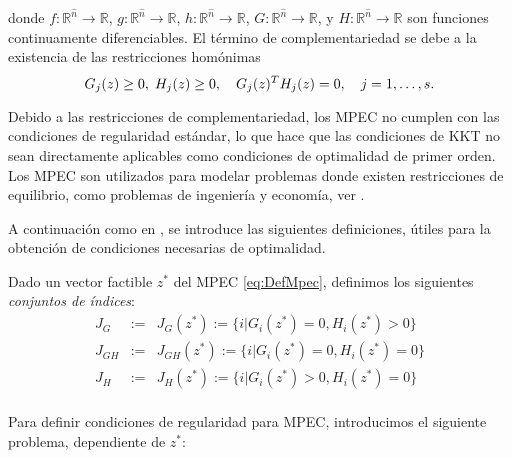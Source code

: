 donde $f: \mathbb{R}^{\hat{n}} \to \mathbb{R}$, $g: \mathbb{R}^{\hat{n}} \to \mathbb{R}$, $h: \mathbb{R}^{\hat{n}} \to \mathbb{R}$, $G: \mathbb{R}^{\hat{n}} \to \mathbb{R}$, y $H: \mathbb{R}^{\hat{n}} \to \mathbb{R}$ son funciones continuamente diferenciables. 
El término de complementariedad se debe a la existencia de las restricciones homónimas 
\begin{equation}
    G_j(z) \geq 0, \; H_j(z) \geq 0, \quad G_j(z)^T H_j(z) = 0,\quad  j=1,\ldots,s. \\ \label{eq:RestriccionesComplementariedadAbstracto}
\end{equation}

Debido a las restricciones de complementariedad, los MPEC no cumplen con las condiciones de regularidad estándar, lo que hace que las condiciones de KKT no sean directamente aplicables como condiciones de optimalidad de primer orden. Los MPEC son utilizados para modelar problemas donde existen restricciones de equilibrio, como problemas de ingeniería y economía, ver \cite{Flegel2003AFJ,DempeyZemkoho2020}.



A continuación como en \cite{Flegel2003AFJ}, se introduce las siguientes definiciones, \'utiles para la obtención de condiciones necesarias de optimalidad.
\begin{definition}
Dado un vector factible $z^*$ del MPEC \eqref{eq:DefMpec}, definimos los siguientes \textit{conjuntos de índices}:
\begin{equation}
\begin{aligned}
J_G&:=& J_G(z^*) := \{i|G_i(z^*) = 0, H_i(z^*) > 0\} \\
J_{GH}&:=& J_{GH}(z^*) := \{i|G_i(z^*) = 0, H_i(z^*) = 0\}  \\
J_H &:= &J_H(z^*) := \{i|G_i(z^*) > 0, H_i(z^*) = 0\}  \\
\end{aligned}
\label{eq:ConjuntoDeIndices} 
\end{equation}
\end{definition}

Para definir condiciones de regularidad para MPEC, introducimos el siguiente problema, dependiente de $z^*$:

